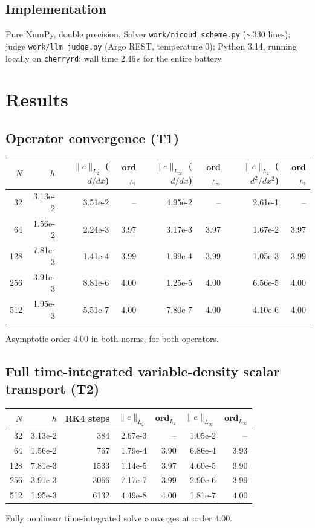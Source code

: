\documentclass[11pt]{article}
\begin{document}
\subsection{Implementation}
Pure NumPy, double precision. Solver \texttt{work/nicoud\_scheme.py}
($\sim$330 lines); judge \texttt{work/llm\_judge.py} (Argo REST, temperature 0);
Python 3.14, running locally on \texttt{cherryrd}; wall time 2.46\,s for the
entire battery.

\section{Results}
\subsection{Operator convergence (T1)}
\begin{center}
\begin{tabular}{rrrrrrrr}
\toprule
$N$ & $h$ & $\|e\|_{L_2}$ ($d/dx$) & ord$_{L_2}$ & $\|e\|_{L_\infty}$ ($d/dx$) & ord$_{L_\infty}$ & $\|e\|_{L_2}$ ($d^2/dx^2$) & ord$_{L_2}$\\
\midrule
32  & 3.13e-2 & 3.51e-2 & --   & 4.95e-2 & --   & 2.61e-1 & --  \\
64  & 1.56e-2 & 2.24e-3 & 3.97 & 3.17e-3 & 3.97 & 1.67e-2 & 3.97\\
128 & 7.81e-3 & 1.41e-4 & 3.99 & 1.99e-4 & 3.99 & 1.05e-3 & 3.99\\
256 & 3.91e-3 & 8.81e-6 & 4.00 & 1.25e-5 & 4.00 & 6.56e-5 & 4.00\\
512 & 1.95e-3 & 5.51e-7 & 4.00 & 7.80e-7 & 4.00 & 4.10e-6 & 4.00\\
\bottomrule
\end{tabular}
\end{center}
Asymptotic order \(4.00\) in both norms, for both operators. \checkmark

\subsection{Full time-integrated variable-density scalar transport (T2)}
\begin{center}
\begin{tabular}{rrrrrrr}
\toprule
$N$ & $h$ & RK4 steps & $\|e\|_{L_2}$ & ord$_{L_2}$ & $\|e\|_{L_\infty}$ & ord$_{L_\infty}$\\
\midrule
32  & 3.13e-2 & 384  & 2.67e-3 & --   & 1.05e-2 & --  \\
64  & 1.56e-2 & 767  & 1.79e-4 & 3.90 & 6.86e-4 & 3.93\\
128 & 7.81e-3 & 1533 & 1.14e-5 & 3.97 & 4.60e-5 & 3.90\\
256 & 3.91e-3 & 3066 & 7.17e-7 & 3.99 & 2.90e-6 & 3.99\\
512 & 1.95e-3 & 6132 & 4.49e-8 & 4.00 & 1.81e-7 & 4.00\\
\bottomrule
\end{tabular}
\end{center}
Fully nonlinear time-integrated solve converges at order \(4.00\). \checkmark
\end{document}

